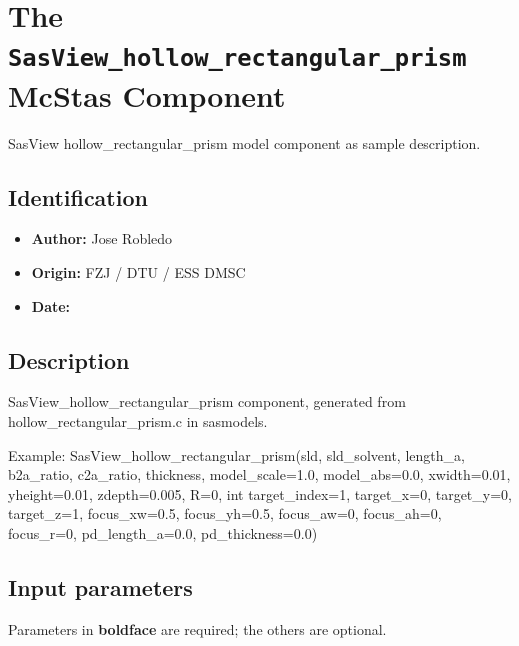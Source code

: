 \section{The \texttt{SasView\_hollow\_rectangular\_prism} McStas Component}
SasView hollow\_rectangular\_prism model component as sample description.

\subsection*{Identification}
\begin{itemize}
  \item \textbf{Author:} Jose Robledo
  \item \textbf{Origin:} FZJ / DTU / ESS DMSC
  \item \textbf{Date:} 
\end{itemize}

\subsection*{Description}
SasView\_hollow\_rectangular\_prism component, generated from hollow\_rectangular\_prism.c in sasmodels.

Example: SasView\_hollow\_rectangular\_prism(sld, sld\_solvent, length\_a, b2a\_ratio, c2a\_ratio, thickness, model\_scale=1.0, model\_abs=0.0, xwidth=0.01, yheight=0.01, zdepth=0.005, R=0, int target\_index=1, target\_x=0, target\_y=0, target\_z=1, focus\_xw=0.5, focus\_yh=0.5, focus\_aw=0, focus\_ah=0, focus\_r=0, pd\_length\_a=0.0, pd\_thickness=0.0)

\subsection*{Input parameters}
Parameters in \textbf{boldface} are required; the others are optional.

